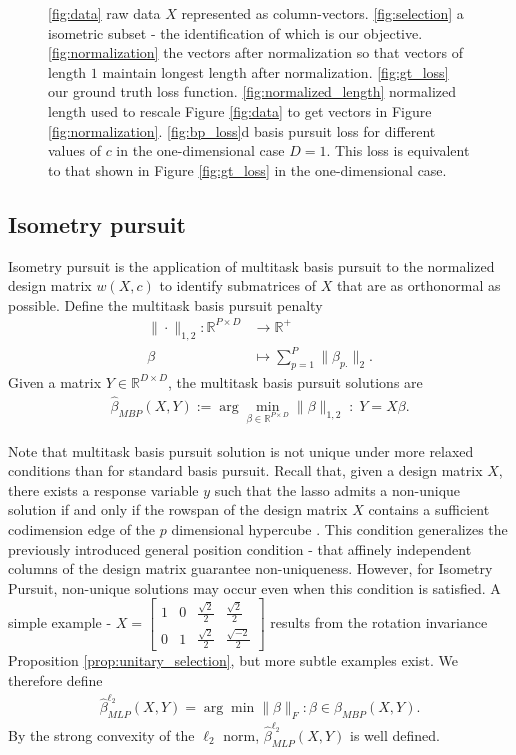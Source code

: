 \begin{figure}
\caption{\ref{fig:data} raw data $X$ represented as column-vectors.
 \ref{fig:selection} a isometric subset - the identification of which is our objective.
 \ref{fig:normalization} the vectors after normalization so that vectors of length $1$ maintain longest length after normalization.
 \ref{fig:gt_loss} our ground truth loss function.
 \ref{fig:normalized_length} normalized length used to rescale Figure \ref{fig:data} to get vectors in Figure \ref{fig:normalization}.
 \ref{fig:bp_loss}d basis pursuit loss for different values of $c$ in the one-dimensional case $D = 1$. 
This loss is equivalent to that shown in Figure \ref{fig:gt_loss} in the one-dimensional case.
\label{fig:losses}
}
\end{figure}


\subsection{Isometry pursuit}

Isometry pursuit is the application of multitask basis pursuit to the normalized design matrix $w(X, c)$ to identify submatrices of $ X$ that are as orthonormal as possible.
Define the multitask basis pursuit penalty 
\begin{align}
\label{eq:bp}
\| \cdot \|_{1,2}: \mathbb R^{P \times D} &\to \mathbb R^+ \\ 
\beta &\mapsto  \sum_{p=1}^P  \|\beta_{p.}\|_2.
\end{align}
Given a matrix $Y \in \mathbb R^{D \times D}$, the multitask basis pursuit solutions are
\begin{align}
\label{prog:multitask_basis_pursuit}
\widehat {\mathcal {\beta}}_{MBP} (X, Y)  := \arg \min_{\beta \in \mathbb R^{P \times D}} \| \beta \|_{1,2} \; : \;Y =  X \beta.
\end{align}

Note that multitask basis pursuit solution is not unique under more relaxed conditions than for standard basis pursuit.
Recall that, given a design matrix $X$, there exists a response variable $y$ such that the lasso admits a non-unique solution if and only if the rowspan of the design matrix $X$ contains a sufficient codimension edge of the $p$ dimensional hypercube \citep{JMLR:v23:21-0420}.
This condition generalizes the previously introduced general position condition - that affinely independent columns of the design matrix guarantee non-uniqueness.
However, for Isometry Pursuit, non-unique solutions may occur even when this condition is satisfied.
A simple example -
$X =
\begin{bmatrix}
1 & 0 & \frac{\sqrt{2}}{2} & \frac{\sqrt{2}}{2}  \\
0 & 1 & \frac{\sqrt{2}}{2} & \frac{\sqrt{-2}}{2}  
\end{bmatrix}$
results from the rotation invariance Proposition \ref{prop:unitary_selection}, but more subtle examples exist.
We therefore define
\begin{align}
\widehat \beta^{\ell_2}_{MLP} (X,Y) = \arg \min \|\beta\|_F : \beta \in \mathcal \beta_{MBP} (X, Y) .
\end{align}
By the strong convexity of the $\ell_2$ norm, $\widehat \beta^{\ell_2}_{MLP} (X,Y)$ is well defined.

